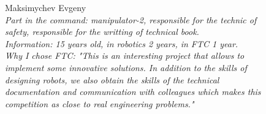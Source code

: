\begin{figure}[H]
	\begin{minipage}{0.47\linewidth}
		Maksimychev Evgeny\\
		\emph{Part in the command: manipulator-2, responsible for the technic of safety, responsible for the writting of technical book. \\}
		\emph{Information: 15 years old, in robotics 2 years, in FTC 1 year. \\}
		\emph{Why I chose FTC: "This is an interesting project that allows to implement some innovative solutions. In addition to the skills of designing robots, we also obtain the skills of the technical documentation and communication with colleagues which makes this competition as close to real engineering problems."}			
	\end{minipage}
	\hfill
	\begin{minipage}{0.47\linewidth}
		\\
	\end{minipage}
	\vfill	
	\begin{minipage}{0.47\linewidth}

\end{minipage}
\end{figure}
